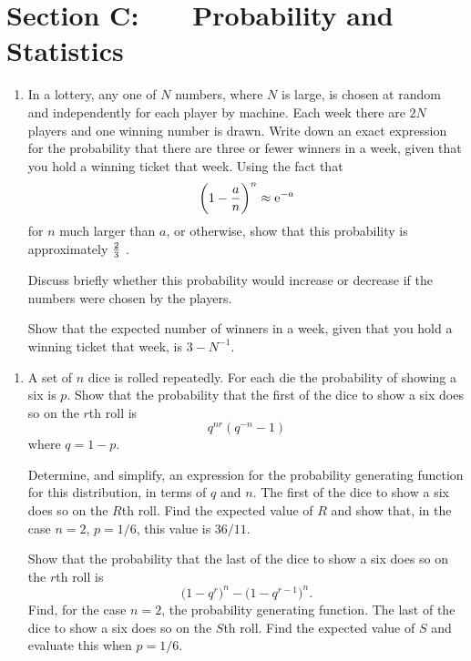 \documentclass[a4, 11pt]{report}
\newlength{\qspace}
\newcounter{qnumber}
\newenvironment{question}%
 {\vspace{\qspace}
  \begin{enumerate}[\bfseries 1\quad][10]%
    \setcounter{enumi}{\value{qnumber}}%
    \item%
 }
{
  \end{enumerate}
  \filbreak
  \stepcounter{qnumber}
 }
\def\e{{\mathrm e}}
\begin{document}
	
	\newpage
\section*{Section C: \ \ \ Probability and Statistics}


\begin{question}
In a lottery, any one of $N$ numbers, where $N$ is large,  
is chosen at random and independently for each player by  
machine. Each week there are $2N$ players 
 and one winning number is drawn. Write down an  
exact expression for the probability that there are  
three or fewer winners in a week, given that you hold  
a winning ticket that week. Using the fact that  
$$ 
{\biggl( 1 - {a \over n} \biggr) ^n \approx \e^{-a}}$$ 
for $n$ much larger than $a$, or otherwise, show that this probability  
is approximately ${2 \over 3}$ . 
 
Discuss briefly whether  
 this probability would  increase or decrease  
if the numbers were chosen by the players. 
 
 
Show that the expected number of winners in a week,  
given that you hold a winning ticket that week, is 
$ 3-N^{-1}$. 

\end{question}

\begin{question}
A set of $n$ dice  is rolled repeatedly. 
For each die the probability  
of showing a six is $p$. Show that  
the probability that the first of the dice to show a six  
does so on the $r$th roll is 
$$q^{n  r } ( q^{-n} - 1 )$$ 
where $q = 1 - p$. 
 
Determine, and simplify,  
an expression for the probability generating function  
for this distribution, in terms of $q$ and $n$. 
The first of the dice to show a six does so on the $R$th roll. Find the  
expected value  of $R$ and show that, in the case 
 $n = 2$, $p=1/6$, this value  is $36/11$. 
 
Show that  the probability that the last of the dice to show a  
six does so on the $r$th roll 
is 
\[ 
\big(1-q^r\big)^n-\big(1-q^{r-1}\big)^n. 
\] 
Find, for the  
case $n = 2$, the probability generating function. The  
last of the dice to show a six does so on the $S$th roll. Find the expected value 
of $S$ and  evaluate this when $p=1/6$. 
\end{question}
\end{document}

